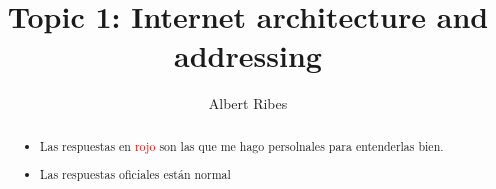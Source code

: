 \documentclass[a4paper,10pt]{article}
\title{Topic 1: Internet architecture and addressing}
\author{Albert Ribes}
\newcommand{\red}[1]{\textcolor{red}{#1}}
\begin{document}
\maketitle

\begin{abstract}
\begin{itemize}
  \item Las respuestas en \red{rojo} son las que me hago persolnales para entenderlas bien.

  \item Las respuestas oficiales están normal
\end{itemize}
\end{abstract}

\listoftodos
\end{document}

